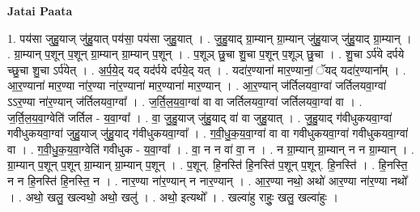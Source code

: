 \documentclass[17pt]{extarticle}
\begin{document}
\textbf{Jatai Paata} \newline

1. पय॑सा जुहु॒याज् जु॑हु॒यात् पय॑सा॒ पय॑सा जुहु॒यात् । . जु॒हु॒याद् ग्रा॒म्यान् ग्रा॒म्यान् जु॑हु॒याज् जु॑हु॒याद् ग्रा॒म्यान् । . ग्रा॒म्यान् प॒शून् प॒शून् ग्रा॒म्यान् ग्रा॒म्यान् प॒शून् । . प॒शूञ् छु॒चा शु॒चा प॒शून् प॒शूञ् छु॒चा । . शु॒चा ऽर्प॑ये दर्पये च्छु॒चा शु॒चा ऽर्प॑येत् । . अ॒र्प॒ये॒द् यद् यद॑र्पये दर्पये॒द् यत् । . यदा॑र॒ण्याना॑ मार॒ण्यानां॒ ॅयद् यदा॑र॒ण्याना᳚म् । . आ॒र॒ण्याना॑ मार॒ण्या ना॑र॒ण्या ना॑र॒ण्याना॑ मार॒ण्याना॑ मार॒ण्यान् । . आ॒र॒ण्यान् ज॑र्तिलयवा॒ग्वा॑ जर्तिलयवा॒ग्वा॑ ऽऽर॒ण्या ना॑र॒ण्यान् ज॑र्तिलयवा॒ग्वा᳚ । . ज॒र्ति॒ल॒य॒वा॒ग्वा॑ वा वा जर्तिलयवा॒ग्वा॑ जर्तिलयवा॒ग्वा॑ वा । . ज॒र्ति॒ल॒य॒वा॒ग्वेति॑ जर्तिल - य॒वा॒ग्वा᳚ । . वा॒ जु॒हु॒याज् जु॑हु॒याद् वा॑ वा जुहु॒यात् । . जु॒हु॒याद् ग॑वीधुकयवा॒ग्वा॑ गवीधुकयवा॒ग्वा॑ जुहु॒याज् जु॑हु॒याद् ग॑वीधुकयवा॒ग्वा᳚ । . ग॒वी॒धु॒क॒य॒वा॒ग्वा॑ वा वा गवीधुकयवा॒ग्वा॑ गवीधुकयवा॒ग्वा॑ वा । . ग॒वी॒धु॒क॒य॒वा॒ग्वेति॑ गवीधुक - य॒वा॒ग्वा᳚ । . वा॒ न न वा॑ वा॒ न । . न ग्रा॒म्यान् ग्रा॒म्यान् न न ग्रा॒म्यान् । . ग्रा॒म्यान् प॒शून् प॒शून् ग्रा॒म्यान् ग्रा॒म्यान् प॒शून् । . प॒शून्. हि॒नस्ति॑ हि॒नस्ति॑ प॒शून् प॒शून्. हि॒नस्ति॑ । . हि॒नस्ति॒ न न हि॒नस्ति॑ हि॒नस्ति॒ न । . नार॒ण्या ना॑र॒ण्यान् न नार॒ण्यान् । . आ॒र॒ण्या नथो॒ अथो॑ आर॒ण्या ना॑र॒ण्या नथो᳚ । . अथो॒ खलु॒ खल्वथो॒ अथो॒ खलु॑ । . अथो॒ इत्यथो᳚ । . खल्वा॑हु राहुः॒ खलु॒ खल्वा॑हुः । \newline
\end{document}
